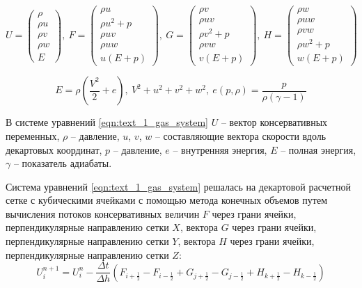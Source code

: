 \begin{equation}
U = \begin{pmatrix}
	\rho \\
	\rho u \\
	\rho v \\
	\rho w \\
	E
\end{pmatrix}, \
F = \begin{pmatrix}
	\rho u \\
	\rho u^2 + p \\
	\rho u v \\
	\rho u w \\
	u (E + p)
\end{pmatrix}, \
G = \begin{pmatrix}
	\rho v \\
	\rho u v \\
	\rho v^2 + p \\
	\rho v w \\
	v (E + p)
\end{pmatrix}, \
H = \begin{pmatrix}
	\rho w \\
	\rho u w \\
	\rho v w \\
	\rho w^2 + p \\
	w (E + p)
\end{pmatrix}
\end{equation}

\begin{equation}
	E = \rho \left( \frac{V^2}{2} + e \right), \ V^2 + u^2 + v^2 + w^2, \ e(p, \rho) = \frac{p}{\rho (\gamma - 1)}
\end{equation}

В системе уравнений \eqref{eqn:text_1_gas_system} $U$ -- вектор консервативных переменных, $\rho$ -- давление, $u$, $v$, $w$ -- составляющие вектора скорости вдоль декартовых координат, $p$ -- давление, $e$ -- внутренняя энергия, $E$ -- полная энергия, $\gamma$ -- показатель адиабаты.

Система уравнений \eqref{eqn:text_1_gas_system} решалась на декартовой расчетной сетке с кубическими ячейками с помощью метода конечных объемов путем вычисления потоков консервативных величин $F$ через грани ячейки, перпендикулярные направлению сетки $X$, вектора $G$ через грани ячейки, перпендикулярные направлению сетки $Y$, вектора $H$ через грани ячейки, перпендикулярные направлению сетки $Z$:
\begin{equation}
	U_i^{n + 1} = U_i^n - \frac{\Delta t}{\Delta h}(F_{i + \frac{1}{2}} - F_{i - \frac{1}{2}} + G_{j + \frac{1}{2}} - G_{j - \frac{1}{2}} + H_{k + \frac{1}{2}} - H_{k - \frac{1}{2}})
\end{equation}

